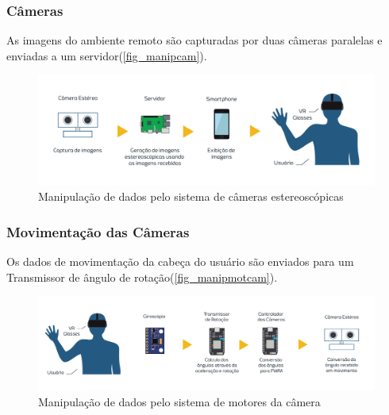 	\subsubsection{Câmeras}\label{subsubsec-elementos-manip-cam}
	As imagens do ambiente remoto são capturadas por duas câmeras paralelas e enviadas a um servidor(\autoref{fig_manipcam}).
		\begin{figure}[h!]
		\caption{\label{fig_manipcam}  Manipulação de dados pelo sistema de câmeras estereoscópicas}
		\begin{center}
			\includegraphics[width=\textwidth]{manipcam.pdf}	
		\end{center}
	\end{figure}
	
	\subsubsection{Movimentação das Câmeras}\label{subsubsec-elementos-manip-cam-motors}
	Os dados de movimentação da cabeça do usuário são enviados para um Transmissor de ângulo de rotação(\autoref{fig_manipmotcam}).
			\begin{figure}[h!]
		\caption{\label{fig_manipmotcam}  Manipulação de dados pelo sistema de motores da câmera}
		\begin{center}
			\includegraphics[width=\textwidth]{manipmotcam.pdf}	
		\end{center}
	\end{figure}
	
